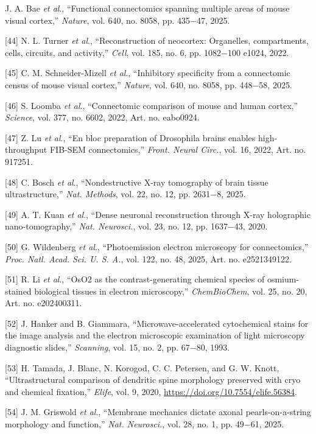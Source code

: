 \documentclass{article}
\begin{document}
\begin{hangpars}
[43] J. A. Bae \emph{et al}., “Functional connectomics spanning multiple areas of mouse visual cortex,” \emph{Nature}, vol. 640, no. 8058, pp. 435−47, 2025.

[44] N. L. Turner \emph{et al}., “Reconstruction of neocortex: Organelles, compartments, cells, circuits, and activity,” \emph{Cell}, vol. 185, no. 6, pp. 1082−100 e1024, 2022.

[45] C. M. Schneider-Mizell \emph{et al}., “Inhibitory specificity from a connectomic census of mouse visual cortex,” \emph{Nature}, vol. 640, no. 8058, pp. 448−58, 2025.

[46] S. Loomba \emph{et al}., “Connectomic comparison of mouse and human cortex,” \emph{Science}, vol. 377, no. 6602, 2022, Art. no. eabo0924.

[47] Z. Lu \emph{et al}., “En bloc preparation of Drosophila brains enables high-throughput FIB-SEM connectomics,” \emph{Front. Neural Circ.}, vol. 16, 2022, Art. no. 917251.

[48] C. Bosch \emph{et al}., “Nondestructive X-ray tomography of brain tissue ultrastructure,” \emph{Nat. Methods}, vol. 22, no. 12, pp. 2631−8, 2025.

[49] A. T. Kuan \emph{et al}., “Dense neuronal reconstruction through X-ray holographic nano-tomography,” \emph{Nat. Neurosci.}, vol. 23, no. 12, pp. 1637−43, 2020.

[50] G. Wildenberg \emph{et al}., “Photoemission electron microscopy for connectomics,” \emph{Proc. Natl. Acad. Sci. U. S. A.}, vol. 122, no. 48, 2025, Art. no. e2521349122.

[51] R. Li \emph{et al}., “OsO2 as the contrast-generating chemical species of osmium-stained biological tissues in electron microscopy,” \emph{ChemBioChem}, vol. 25, no. 20, Art. no. e202400311.

[52] J. Hanker and B. Giammara, “Microwave-accelerated cytochemical stains for the image analysis and the electron microscopic examination of light microscopy diagnostic slides,” \emph{Scanning}, vol. 15, no. 2, pp. 67−80, 1993.

[53] H. Tamada, J. Blanc, N. Korogod, C. C. Petersen, and G. W. Knott, “Ultrastructural comparison of dendritic spine morphology preserved with cryo and chemical fixation,” \emph{Elife}, vol. 9, 2020, \url{https://doi.org/10.7554/elife.56384}.

[54] J. M. Griswold \emph{et al}., “Membrane mechanics dictate axonal pearls-on-a-string morphology and function,” \emph{Nat. Neurosci.}, vol. 28, no. 1, pp. 49−61, 2025.


\end{hangpars}
\end{document}
